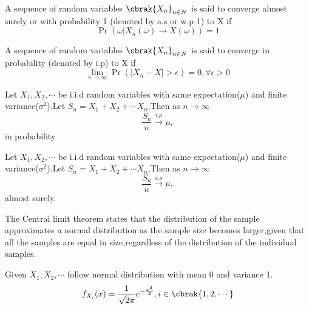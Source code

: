 \begin{definition}
A sequence of random variables $\cbrak{X_n}_{n\in N}$ is said to converge almost surely or with probability 1 (denoted by a.s or w.p 1) to X if \label{dec2018-104:with prob 1}
\begin{equation}
    \Pr(\omega |X_n(\omega) \to X(\omega))=1
\end{equation}
\end{definition}
\begin{definition}
A sequence of random variables $\cbrak{X_n}_{n\in N}$ is said to converge in probability (denoted by i.p) to X if
\begin{equation}
    \lim_{n \to \infty} \Pr(\left| X_{n}-X\right|>\epsilon)=0 ,\forall \epsilon>0
\end{equation}\label{dec2018-104:in prob}
\end{definition}
\begin{theorem}
\label{dec2018-104:theorem}
Let $X_1,X_2,\cdots $ be i.i.d random variables with same expectation($\mu$) and finite variance($\sigma^2$).Let $S_{n}=X_1+X_2+\cdots X_n$,Then as $n \to \infty$
\begin{equation}
    \frac{S_n}{n} \xrightarrow{i.p}  \mu,
\end{equation}
in probability
\end{theorem}
\begin{theorem}
\label{dec2018-104:theorem2}
Let $X_1,X_2,\cdots $ be i.i.d random variables with same expectation($\mu$) and finite variance($\sigma^2$).Let $S_{n}=X_1+X_2+\cdots X_n$,Then as $n \to \infty$
\begin{equation}
    \frac{S_n}{n} \xrightarrow{a.s}  \mu,
\end{equation}
almost surely.
\end{theorem}
\begin{theorem}
\label{dec2018-104:theorem3}
The Central limit theorem states that the distribution of the sample approximates a normal distribution as the sample size becomes larger,given that all the samples are equal in size,regardless of the distribution of the individual samples.
\end{theorem}
Given $X_1,X_2, \cdots$ follow normal distribution with mean 0 and variance 1.
\begin{equation}
    f_{X_i}(x)=\frac{1}{\sqrt{2}\pi}e^{-\frac{x^2}{2}} ,i \in \cbrak{1,2,\cdots}
\end{equation}
